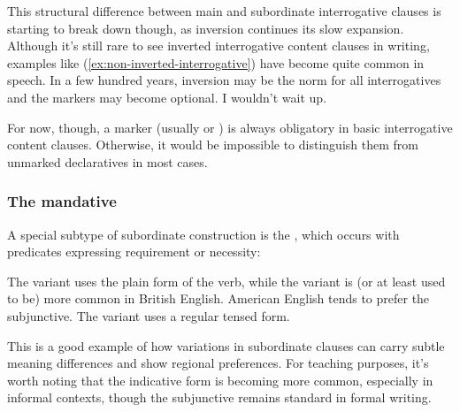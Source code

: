 This structural difference between main and subordinate interrogative clauses is starting to break down though, as inversion continues its slow expansion. Although it's still rare to see inverted interrogative content clauses in writing, examples like (\ref{ex:non-inverted-interrogative}) have become quite common in speech. In a few hundred years, inversion may be the norm for all interrogatives and the markers may become optional. I wouldn't wait up.

\label{ex:non-inverted-interrogative}
\z
For now, though, a marker (usually  or ) is always obligatory in basic interrogative content clauses. Otherwise, it would be impossible to distinguish them from unmarked declaratives in most cases.

\subsubsection*{The mandative}

A special subtype of subordinate construction is the , which occurs with predicates expressing requirement or necessity:

\ea \label{ex:mandative}
    \z
\z
The  variant uses the plain form of the verb, while the  variant is (or at least used to be) more common in British English. American English tends to prefer the subjunctive. The  variant uses a regular tensed form.

This is a good example of how variations in subordinate clauses can carry subtle meaning differences and show regional preferences. For teaching purposes, it's worth noting that the indicative form is becoming more common, especially in informal contexts, though the subjunctive remains standard in formal writing.

